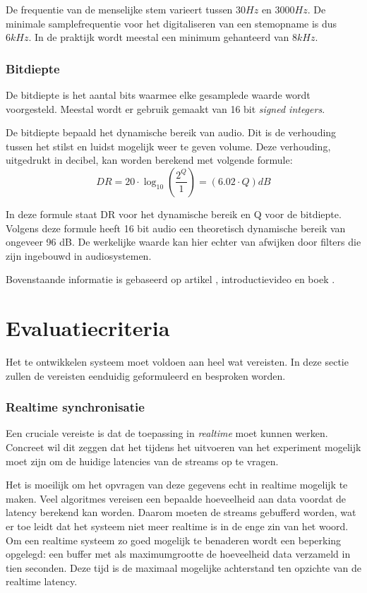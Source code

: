 De frequentie van de menselijke stem varieert tussen $ 30 Hz $ en $ 3000 Hz $. De minimale samplefrequentie voor het digitaliseren van een stemopname is dus $ 6kHz $. In de praktijk wordt meestal een minimum gehanteerd van $ 8kHz $.

\subsubsection{Bitdiepte}

De bitdiepte is het aantal bits waarmee elke gesamplede waarde wordt voorgesteld. Meestal wordt er gebruik gemaakt van 16 bit \textit{signed integers}.

De bitdiepte bepaald het dynamische bereik van audio. Dit is de verhouding tussen het stilst en luidst mogelijk weer te geven volume. Deze verhouding, uitgedrukt in decibel, kan worden berekend met volgende formule: 
\begin{equation}
DR = 20 \cdot \log_{10} \left(\frac{2^Q}{1}\right) = (6.02 \cdot Q) dB
\end{equation}

In deze formule staat DR voor het dynamische bereik en Q voor de bitdiepte. Volgens deze formule heeft 16 bit audio een theoretisch dynamische bereik van ongeveer 96 dB. De werkelijke waarde kan hier echter van afwijken door filters die zijn ingebouwd in audiosystemen.

Bovenstaande informatie is gebaseerd op artikel \cite{tarsosmanual2016}, introductievideo \cite{xiph2016} en boek \cite{fries2005digital}.

\section{Evaluatiecriteria}
\label{evaluatie-criteria}

Het te ontwikkelen systeem moet voldoen aan heel wat vereisten. In deze sectie zullen de vereisten eenduidig geformuleerd en besproken worden.  

\subsubsection{Realtime synchronisatie}

Een cruciale vereiste is dat de toepassing in \textit{realtime} moet kunnen werken. Concreet wil dit zeggen dat het tijdens het uitvoeren van het experiment mogelijk moet zijn om de huidige latencies van de streams op te vragen.

Het is moeilijk om het opvragen van deze gegevens echt in realtime mogelijk te maken. Veel algoritmes vereisen een bepaalde hoeveelheid aan data voordat de latency berekend kan worden. Daarom moeten de streams gebufferd worden, wat er toe leidt dat het systeem niet meer realtime is in de enge zin van het woord. Om een realtime systeem zo goed mogelijk te benaderen wordt een beperking opgelegd: een buffer met als maximumgrootte de hoeveelheid data verzameld in tien seconden. Deze tijd is de maximaal mogelijke achterstand ten opzichte van de realtime latency.

